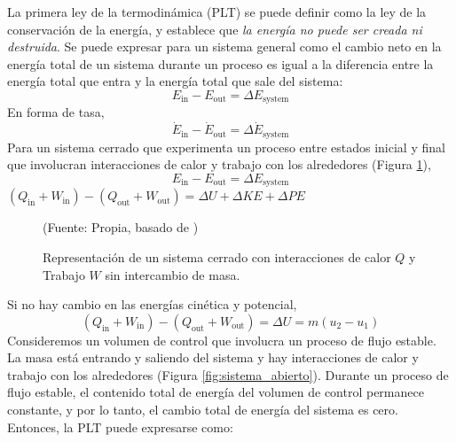 La primera ley de la termodinámica (PLT) se puede definir como la ley de la conservación de la energía, y establece que \textit{la energía no puede ser creada ni destruida}. Se puede expresar para un sistema general como el cambio neto en la energía total de un sistema durante un proceso es igual a la diferencia entre la energía total que entra y la energía total que sale del sistema:
\begin{equation}
	E_{\text{in}} - E_{\text{out}} = \Delta E_{\text{system}}
	\label{eq:primera_ley_energia}
\end{equation}
En forma de tasa,
\begin{equation}
	\dot{E}_{\text{in}} - \dot{E}_{\text{out}} = \Delta \dot{E}_{\text{system}}
	\label{eq:primera_ley_energia_tasa}
\end{equation}
Para un sistema cerrado que experimenta un proceso entre estados inicial y final que involucran interacciones de calor y trabajo con los alrededores (Figura \ref{fig:sistema_cerrado}),
\begin{equation}
	E_{\text{in}} - E_{\text{out}} = \Delta E_{\text{system}}
	\label{eq:primera_ley_energia_sistema_cerrado}
\end{equation}
$(Q_{\text{in}} + W_{\text{in}}) - (Q_{\text{out}} + W_{\text{out}}) = \Delta U + \Delta KE + \Delta PE$
\begin{figure}[H]
	\centering
	\caption{Representación de un sistema cerrado con interacciones de calor $Q$ y Trabajo $W$ sin intercambio de masa.  }(Fuente: Propia, basado de \cite{james-2013}) 
	\label{fig:sistema_cerrado}
\end{figure}
Si no hay cambio en las energías cinética y potencial,
\begin{equation}
	(Q_{\text{in}} + W_{\text{in}}) - (Q_{\text{out}} + W_{\text{out}}) = \Delta U = m(u_2 - u_1)
	\label{eq:primera_ley_energia_sistema_cerrado_2}
\end{equation}
Consideremos un volumen de control que involucra un proceso de flujo estable. La masa está entrando y saliendo del sistema y hay interacciones de calor y trabajo con los alrededores (Figura \ref{fig:sistema_abierto}). Durante un proceso de flujo estable, el contenido total de energía del volumen de control permanece constante, y por lo tanto, el cambio total de energía del sistema es cero. Entonces, la PLT puede expresarse como:
